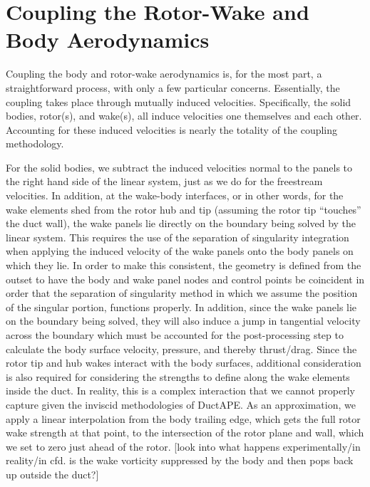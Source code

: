 

\section{Coupling the Rotor-Wake and Body Aerodynamics}

Coupling the body and rotor-wake aerodynamics is, for the most part, a straightforward process, with only a few particular concerns.
%
Essentially, the coupling takes place through mutually induced velocities.
%
Specifically, the solid bodies, rotor(s), and wake(s), all induce velocities one themselves and each other.
%
Accounting for these induced velocities is nearly the totality of the coupling methodology.


For the solid bodies, we subtract the induced velocities normal to the panels to the right hand side of the linear system, just as we do for the freestream velocities.
%
In addition, at the wake-body interfaces, or in other words, for the wake elements shed from the rotor hub and tip (assuming the rotor tip ``touches'' the duct wall), the wake panels lie directly on the boundary being solved by the linear system.
%
This requires the use of the separation of singularity integration when applying the induced velocity of the wake panels onto the body panels on which they lie.
%
In order to make this consistent, the geometry is defined from the outset to have the body and wake panel nodes and control points be coincident in order that the separation of singularity method in which we assume the position of the singular portion, functions properly.
%
In addition, since the wake panels lie on the boundary being solved, they will also induce a jump in tangential velocity across the boundary which must be accounted for the post-processing step to calculate the body surface velocity, pressure, and thereby thrust/drag.
%
Since the rotor tip and hub wakes interact with the body surfaces, additional consideration is also required for considering the strengths to define along the wake elements inside the duct.
%
In reality, this is a complex interaction that we cannot properly capture given the inviscid methodologies of DuctAPE.
%
As an approximation, we apply a linear interpolation from the body trailing edge, which gets the full rotor wake strength at that point, to the intersection of the rotor plane and wall, which we set to zero just ahead of the rotor.
%
[look into what happens experimentally/in reality/in cfd.  is the wake vorticity suppressed by the body and then pops back up outside the duct?]



